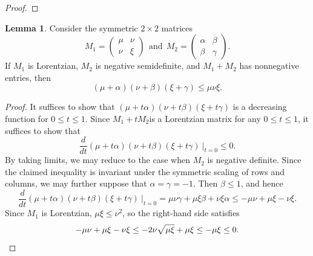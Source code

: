 \documentclass{amsart}
\theoremstyle{definition}
\newtheorem{lemma}[theorem]{Lemma}
\theoremstyle{remark}
\begin{document}
\begin{proof}
\end{proof}

\begin{lemma}\label{lem:lor_plus_nsd}
Consider the symmetric $2 \times 2$ matrices
\[
M_1=\begin{pmatrix}
    \mu&\nu\\
    \nu&\xi
\end{pmatrix} \ \ \text{and} \ \ 
M_2=\begin{pmatrix}
\alpha&\beta\\
\beta&\gamma
\end{pmatrix}.
\]
If $M_1$ is Lorentzian, $M_2$ is negative semidefinite, and $M_1+M_2$ has nonnegative entries, then
\[
(\mu+\alpha)(\nu+\beta)(\xi+\gamma) \le \mu\nu\xi .
\]
\end{lemma}
\begin{proof}
It suffices to show that $(\mu+t\alpha)(\nu+t\beta)(\xi+t\gamma)$ is a decreasing function for $0\leq t\leq 1$. 
Since $M_1+tM_2$is a Lorentzian matrix for any $0\leq t\leq 1$, it suffices to show that  
\[
\frac{d}{dt}(\mu+t\alpha)(\nu+t\beta)(\xi+t\gamma) \ \bigg|_{t=0}\leq 0.
\]
By taking limits, we may reduce to the case when $M_2$ is negative definite.
Since the claimed inequality is invariant under the symmetric scaling of rows and columns, we may further suppose that $\alpha=\gamma=-1$.
Then $\beta \le 1$, and hence
\[
\frac{d}{dt}(\mu+t\alpha)(\nu+t\beta)(\xi+t\gamma)\ \bigg|_{t=0}=\mu\nu\gamma+\mu\xi\beta+\nu\xi\alpha
\leq -\mu\nu+\mu\xi-\nu\xi.
\]
Since $M_1$ is Lorentzian, $\mu\xi\leq \nu^2$, so the right-hand side satisfies
\[
-\mu\nu+\mu\xi-\nu\xi \le -2\nu \sqrt{\mu\xi}+\mu\xi \le - \mu\xi \le 0.\qedhere
\]
\end{proof}
\end{document}
